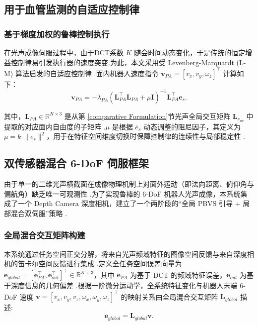 \documentclass{article}
\begin{document}
\subsection{用于血管监测的自适应控制律}
\label{sec:Adaptive_Control_Law}

\subsubsection{基于梯度加权的鲁棒控制执行}

在光声成像伺服过程中，由于DCT系数 $K$ 随会时间动态变化，于是传统的恒定增益控制律易引发执行器的速度突变.为此，本文采用受 Levenberg-Marquardt (L-M) 算法启发的自适应控制律 .面内机器人速度指令 $\mathbf{v}_{PA} = [v_x, v_y, \omega_z]^\top$ 计算如下\cite{dame2009entropy,collewet2011photometric,marchand2019subspace}：
\begin{equation}
\mathbf{v}_{PA} = -\lambda_{PA} (\mathbf{L}_{PA}^\top \mathbf{L}_{PA} + \mu \mathbf{I})^{-1} \mathbf{L}_{PA}^\top \mathbf{e}_s.
\end{equation}

其中，$\boldsymbol{\mathbf{L}}_{PA} \in \mathbb{R}^{K \times 3}$ 是从第 \cref{comparative Formulation}节光声全局交互矩阵 $\boldsymbol{L}_{s_{uv}}$ 中提取的对应面内自由度的子矩阵 .$\mu$ 是根据 $\bar{e}_s$ 动态调整的阻尼因子，其定义为$\mu = k \cdot \|e_s\|^2$，用于在特征空间维度切换时保障控制律的连续性与局部稳定性 .

\subsection{双传感器混合 6-DoF 伺服框架}
由于单一的二维光声横截面在成像物理机制上对面外运动（即法向距离、俯仰角与偏航角）缺乏唯一可观测性 .为了实现鲁棒的 6-DoF 机器人光声成像，本系统集成了一个 Depth Camera 深度相机，建立了一个两阶段的“全局 PBVS 引导 + 局部混合双伺服”策略 .


\subsubsection{全局混合交互矩阵构建}

本系统通过任务空间正交分解，将来自光声频域特征的图像空间反馈与来自深度相机的笛卡尔空间反馈进行集成 .定义全任务空间误差向量为 $\mathbf{e}_{global} = [\mathbf{e}_{PA}^\top, \mathbf{e}_{out}^\top]^\top \in \mathbb{R}^{K+3}$，其中 $\mathbf{e}_{PA}$ 为基于 DCT 的频域特征误差，$\mathbf{e}_{out}$ 为基于深度信息的几何偏差 .根据一阶微分运动学，全系统特征变化与机器人末端 6-DoF 速度 $\mathbf{v} = [v_x, v_y, v_z, \omega_x, \omega_y, \omega_z]^\top$ 的映射关系由全局混合交互矩阵 $\mathbf{L}_{global}$ 描述: 
\begin{equation}
    \dot{\mathbf{e}}_{global} = \mathbf{L}_{global} \mathbf{v}.
\end{equation}
\end{document}
